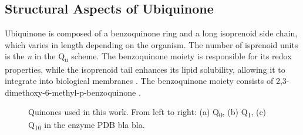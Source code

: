 \subsection{Structural Aspects of Ubiquinone}
Ubiquinone is composed of a benzoquinone ring and a long isoprenoid side chain, which varies in length depending on the organism. The number of isprenoid units is the \textit{n} in the Q\textsubscript{n} scheme. The benzoquinone moiety is responsible for its redox properties, while the isoprenoid tail enhances its lipid solubility, allowing it to integrate into biological membranes \cite{ernster1995biochemical}. The benzoquinone moiety consists of 2,3-dimethoxy-6-methyl-p-benzoquinone \cite{ernster1995biochemical}.

\begin{figure}[h]
  \centering
  \caption[Quinone structures]{Quinones used in this work. From left to right: (a) Q\textsubscript{0}, (b) Q\textsubscript{1}, (c) Q\textsubscript{10} in the enzyme PDB bla bla.}
  \label{fig:QuinoneTypes}
\end{figure}

